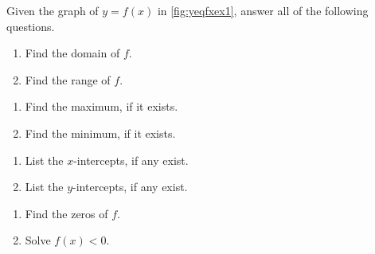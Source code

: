\begin{ex}  Given the graph of $y = f(x)$ in \autoref{fig:yeqfxex1}, answer all of the following questions.
\label{tame}

\begin{multicols}{2}
\begin{enumerate}

\item  Find the domain of $f$.

\item  Find the range of $f$.

\setcounter{HW}{\value{enumi}}
\end{enumerate}
\end{multicols}

\begin{multicols}{2}
\begin{enumerate}
\setcounter{enumi}{\value{HW}}

\item  Find the maximum, if it exists.

\item  Find the minimum, if it exists.

\setcounter{HW}{\value{enumi}}
\end{enumerate}
\end{multicols}


\begin{multicols}{2}
\begin{enumerate}
\setcounter{enumi}{\value{HW}}

\item  List the $x$-intercepts, if any exist.

\item  List the $y$-intercepts, if any exist.

\setcounter{HW}{\value{enumi}}
\end{enumerate}
\end{multicols}

\begin{multicols}{2}
\begin{enumerate}
\setcounter{enumi}{\value{HW}}

\item  Find the zeros of $f$.

\item  Solve $f(x) < 0$.

\setcounter{HW}{\value{enumi}}
\end{enumerate}
\end{multicols}


\end{ex}
